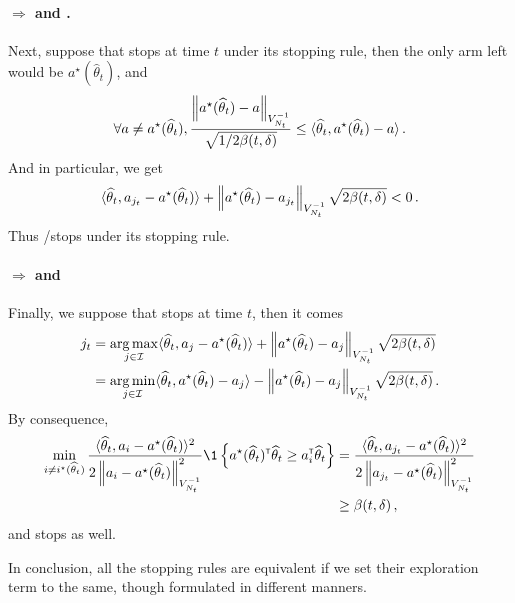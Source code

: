 \paragraph{\ALBA $\Rightarrow$ \LGapE and \GLGapE.}
Next, suppose that \ALBA stops at time $t$ under its stopping rule, then the only arm left would be $a^\star(\hat\theta_t)$, and
\[
    \forall a \neq a^\star(\widehat\theta_t), \dfrac{\left\lVert a^\star(\widehat\theta_t)-a\right\rVert_{V_{N_t}^{-1}}}{\sqrt{1/2\beta(t,\delta)}} \le \langle\widehat\theta_t,a^\star(\widehat\theta_t)-a\rangle\,.
\]
And in particular, we get
\[
    \langle\widehat\theta_t,a_{j_t}-a^\star(\widehat\theta_t)\rangle + \left\lVert a^\star(\widehat\theta_t) - a_{j_t}\right\rVert_{V_{N_t}^{-1}} \sqrt{2\beta(t,\delta)} < 0\,.
\]
Thus \LGapE/\GLGapE stops under its stopping rule.

\paragraph{\LGapE $\Rightarrow$ \LGC and \LG}
Finally, we suppose that \LGapE stops at time $t$, then it comes
\begin{align*}
    j_t &= \operatorname*{arg\,max}_{j\in\mathcal{I}} \langle\widehat\theta_t,a_{j}-a^\star(\widehat\theta_t)\rangle + \left\lVert a^\star(\widehat\theta_t) - a_{j}\right\rVert_{V_{N_t}^{-1}} \sqrt{2\beta(t,\delta)} \\
    &= \operatorname*{arg\,min}_{j\in\mathcal{I}} \langle\widehat\theta_t,a^\star(\widehat\theta_t)-a_{j}\rangle - \left\lVert a^\star(\widehat\theta_t) - a_{j}\right\rVert_{V_{N_t}^{-1}} \sqrt{2\beta(t,\delta)}\,.
\end{align*}
By consequence,
\begin{align*}
	\min_{i \neq i^\star(\hat{\theta}_{t})} \dfrac{\langle\hat\theta_t,a_{i}-a^\star(\hat\theta_t)\rangle^2}{2\normm{a_i - a^\star(\hat\theta_t)}_{{V_{N_t}^{-1}}}^2} \1\left\{a^\star(\hat\theta_t)^\top\hat\theta_t \geq a_i^\top\hat\theta_t\right\} &= \dfrac{\langle\hat\theta_t,a_{j_t}-a^\star(\hat\theta_t)\rangle^2}{2\normm{a_{j_t} - a^\star(\hat\theta_t)}_{{V_{N_t}^{-1}}}^2}\\
	&\geq \beta(t,\delta)\,,
\end{align*}
and \LGC stops as well.

In conclusion, all the stopping rules are equivalent if we set their exploration term to the same, though formulated in different manners.
